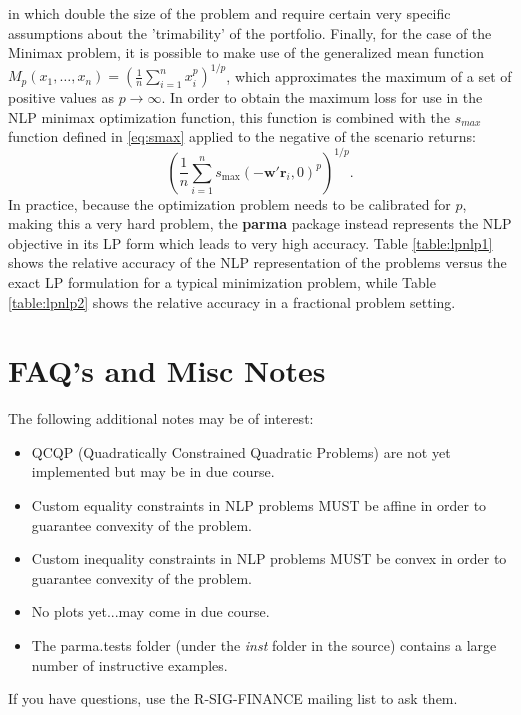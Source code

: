 in  which double the size of the problem and require
certain very specific assumptions about the 'trimability' of the portfolio.
Finally, for the case of the Minimax problem, it is possible to make use of
the generalized mean function ${M_p}\left( {{x_1},\dots,{x_n}} \right)={\left(
{\frac{1}{n}\sum\limits_{i=1}^n {x_i^p} } \right)^{1/p}}$, which
approximates the maximum of a set of positive values as $p \to  \infty$. In
order to obtain the maximum loss for use in the NLP minimax optimization
function, this function is combined with the $s_{max}$ function defined in
\eqref{eq:smax} applied to the negative of the scenario returns:
\begin{equation}\label{eq:sminimax}
{\left( {\frac{1}{n}\sum\limits_{i=1}^n {{s_{\max }}{{\left( { - {\mathbf{w}}'{\mathbf{r}_i},0} \right)}^p}} } \right)^{1/p}}.
\end{equation}
In practice, because the optimization problem needs to be calibrated for $p$,
making this a very hard problem, the \textbf{parma} package instead represents
the NLP objective in its LP form which leads to very high accuracy.
Table \ref{table:lpnlp1} shows the relative accuracy of the NLP representation of the
problems versus the exact LP formulation for a typical minimization problem, while
Table \ref{table:lpnlp2} shows the relative accuracy in a fractional problem setting.


\section{FAQ's and Misc Notes}\label{sec:6}
The following additional notes may be of interest:
\begin{itemize}
\item QCQP (Quadratically Constrained Quadratic Problems) are not yet
    implemented but may be in due course.
\item Custom equality constraints in NLP problems MUST be affine in order
    to  guarantee convexity of the problem.
\item Custom inequality constraints in NLP problems MUST be convex in
    order to  guarantee convexity of the problem.
\item No plots yet...may come in due course.
\item The parma.tests folder (under the \emph{inst} folder in the source)
    contains a large number of instructive examples.
\end{itemize}
If you have questions, use the R-SIG-FINANCE mailing list to ask them.\\ 